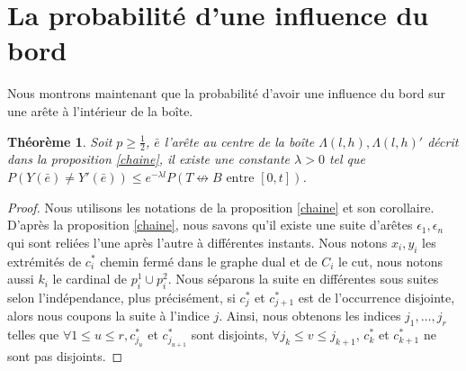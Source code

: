 \documentclass[titlepage,a4paper,12pt]{article}
\newcounter{thm}
\newcounter{prop}
\newcounter{cor}
\newtheorem{cvg}[thm]{Théorème}
\begin{document}
\section{La probabilité d'une influence du bord}

Nous montrons maintenant que la probabilité d'avoir une influence du bord sur une arête à l'intérieur de la boîte. 
\begin{cvg}
Soit $p\geqslant \frac{1}{2}$, $\bar{e}$ l'arête au centre de la boîte $\Lambda(l,h), \Lambda(l,h)'$ décrit dans la proposition \ref{chaine}, il existe une constante $\lambda> 0$ tel que $P(Y(\bar{e})\neq Y'(\bar{e})) \leqslant e^{-\lambda l} P(T\nleftrightarrow B \text{ entre }[0,t])$.
\end{cvg}

\begin{proof}

Nous utilisons les notations de la proposition \ref{chaine} et son corollaire.
D'après la proposition \ref{chaine}, nous savons qu'il existe une suite d'arêtes $\epsilon_1,\epsilon_n$ qui sont reliées l'une après l'autre à différentes instants. Nous notons $x_i,y_i$ les extrémités de $c_i^*$ chemin fermé dans le graphe dual et de $C_i$ le cut, nous notons aussi $k_i$ le cardinal de $p_i^1\cup p_i^2$. Nous séparons la suite en différentes sous suites selon l'indépendance, plus précisément, si $c^*_j$ et $c^*_{j+1}$  est de l'occurrence disjointe, alors nous coupons la suite à l'indice $j$. Ainsi, nous obtenons les indices $j_1,\dots,j_r$ telles que $\forall 1\leqslant u\leqslant r, c^*_{j_u}$ et $c^*_{j_{u+1}}$ sont disjoints, $\forall j_k \leqslant v \leqslant j_{k+1}$, $c_k^*$ et $c_{k+1}^*$ ne sont pas disjoints.


\end{proof}
\end{document}
